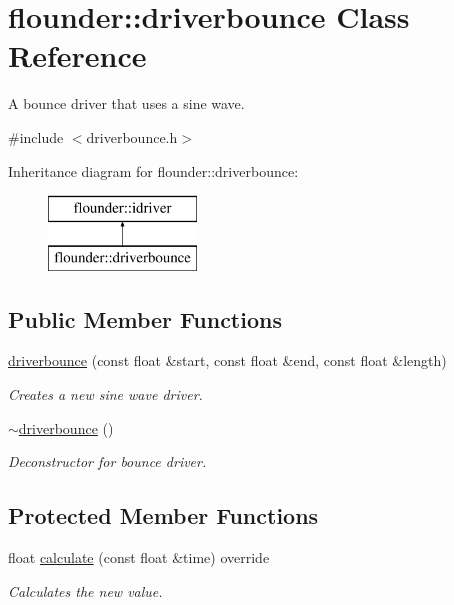 \hypertarget{classflounder_1_1driverbounce}{}\section{flounder\+:\+:driverbounce Class Reference}
\label{classflounder_1_1driverbounce}


A bounce driver that uses a sine wave.  




{\ttfamily \#include $<$driverbounce.\+h$>$}

Inheritance diagram for flounder\+:\+:driverbounce\+:\begin{figure}[H]
\begin{center}
\leavevmode
\includegraphics[height=2.000000cm]{classflounder_1_1driverbounce}
\end{center}
\end{figure}
\subsection*{Public Member Functions}
\begin{DoxyCompactItemize}
\item 
\hyperlink{classflounder_1_1driverbounce_a92651c598bb5e6b7d8d8f686fc07bcd1}{driverbounce} (const float \&start, const float \&end, const float \&length)
\begin{DoxyCompactList}\small\item\em Creates a new sine wave driver. \end{DoxyCompactList}\item 
\hyperlink{classflounder_1_1driverbounce_ae077e73f2f73847898a149a2812c3ea5}{$\sim$driverbounce} ()
\begin{DoxyCompactList}\small\item\em Deconstructor for bounce driver. \end{DoxyCompactList}\end{DoxyCompactItemize}
\subsection*{Protected Member Functions}
\begin{DoxyCompactItemize}
\item 
float \hyperlink{classflounder_1_1driverbounce_a2781832b47206849a0028ee75a4772e4}{calculate} (const float \&time) override
\begin{DoxyCompactList}\small\item\em Calculates the new value. \end{DoxyCompactList}\end{DoxyCompactItemize}
